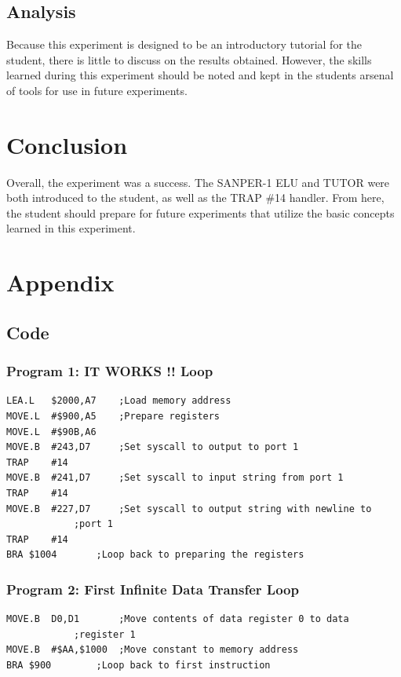 \documentclass[12pt, twocolumn]{article}
\begin{document}
\subsection{Analysis}
Because this experiment is designed to be an introductory tutorial for the student, there is little to discuss on the results obtained. However, the skills learned during this experiment should be noted and kept in the students arsenal of tools for use in future experiments.  
\section{Conclusion}
Overall, the experiment was a success. The \textsc{SANPER-1 ELU} and \textsc{TUTOR} were both introduced to the student, as well as the TRAP \#14 handler. From here, the student should prepare for future experiments that utilize the basic concepts learned in this experiment.
\onecolumn
\section{Appendix}
\label{appendix}
\subsection{Code}
\subsubsection{Program 1: \normalfont IT WORKS !! Loop}
\label{prog1}
\lstset{language=[Motorola68K]Assembler}
\begin{lstlisting}
LEA.L	$2000,A7	;Load memory address
MOVE.L	#$900,A5	;Prepare registers
MOVE.L	#$90B,A6	
MOVE.B	#243,D7		;Set syscall to output to port 1
TRAP 	#14
MOVE.B	#241,D7		;Set syscall to input string from port 1
TRAP	#14
MOVE.B	#227,D7		;Set syscall to output string with newline to 
			;port 1
TRAP	#14
BRA	$1004		;Loop back to preparing the registers
\end{lstlisting}

\subsubsection{Program 2: \normalfont First Infinite Data Transfer Loop}
\label{prog2}
\begin{lstlisting}
MOVE.B	D0,D1		;Move contents of data register 0 to data 
			;register 1
MOVE.B	#$AA,$1000	;Move constant to memory address
BRA	$900		;Loop back to first instruction
\end{lstlisting}
\end{document}
